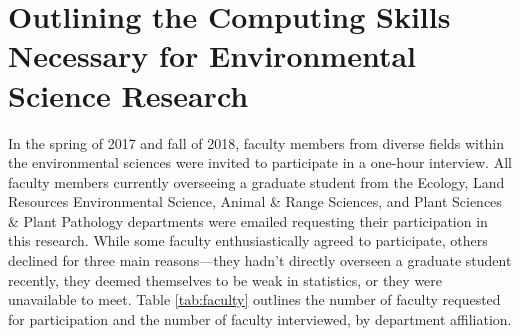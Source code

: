 \documentclass[12pt]{article}
\begin{document}
% 
% 

\section{Outlining the Computing Skills Necessary for Environmental Science Research}
\label{sec:faculty}

% 

\quad In the spring of 2017 and fall of 2018, faculty members from diverse 
fields within the environmental sciences were invited to participate in a 
one-hour interview. All faculty members currently overseeing a graduate student
from the Ecology, Land Resources Environmental Science, Animal \& Range 
Sciences, and Plant Sciences \& Plant Pathology departments were emailed 
requesting their participation in this research. While some faculty 
enthusiastically agreed to participate, others declined for three main 
reasons---they hadn't directly overseen a graduate student recently, they deemed
themselves to be weak in statistics, or they were unavailable to meet. Table 
\ref{tab:faculty} outlines the number of faculty requested for participation and
the number of faculty interviewed, by department affiliation. 
\end{document}
